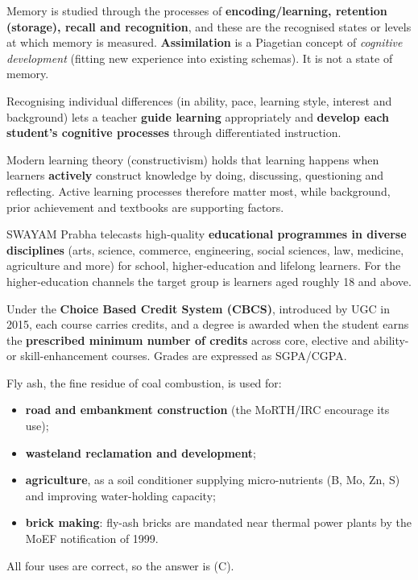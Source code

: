 Memory is studied through the processes of \textbf{encoding/learning, retention (storage), recall and recognition}, and these are the recognised states or levels at which memory is measured. \textbf{Assimilation} is a Piagetian concept of \emph{cognitive development} (fitting new experience into existing schemas). It is not a state of memory.

Recognising individual differences (in ability, pace, learning style, interest and background) lets a teacher \textbf{guide learning} appropriately and \textbf{develop each student's cognitive processes} through differentiated instruction.

Modern learning theory (constructivism) holds that learning happens when learners \textbf{actively} construct knowledge by doing, discussing, questioning and reflecting. Active learning processes therefore matter most, while background, prior achievement and textbooks are supporting factors.

SWAYAM Prabha telecasts high-quality \textbf{educational programmes in diverse disciplines} (arts, science, commerce, engineering, social sciences, law, medicine, agriculture and more) for school, higher-education and lifelong learners. For the higher-education channels the target group is learners aged roughly 18 and above.

Under the \textbf{Choice Based Credit System (CBCS)}, introduced by UGC in 2015, each course carries credits, and a degree is awarded when the student earns the \textbf{prescribed minimum number of credits} across core, elective and ability- or skill-enhancement courses. Grades are expressed as SGPA/CGPA.

Fly ash, the fine residue of coal combustion, is used for:
\begin{itemize}
\item \textbf{road and embankment construction} (the MoRTH/IRC encourage its use);
\item \textbf{wasteland reclamation and development};
\item \textbf{agriculture}, as a soil conditioner supplying micro-nutrients (B, Mo, Zn, S) and improving water-holding capacity;
\item \textbf{brick making}: fly-ash bricks are mandated near thermal power plants by the MoEF notification of 1999.
\end{itemize}
All four uses are correct, so the answer is (C).

